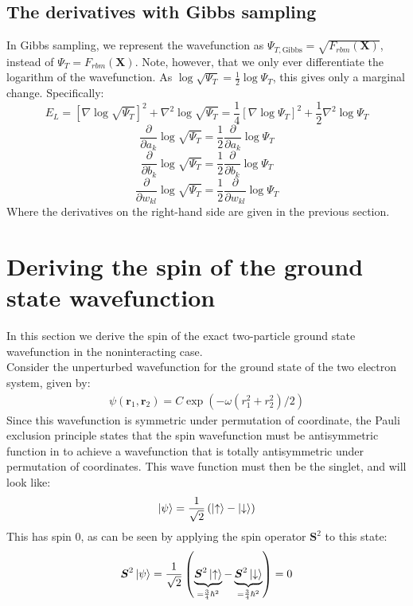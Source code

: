 \documentclass[a4paper, 10pt]{article}
\begin{document}
\begin{appendices}
	\subsection{The derivatives with Gibbs sampling}\label{ap:derivative_gibbs}
	In Gibbs sampling, we represent the wavefunction as $\Psi_{T, \mathrm{Gibbs}}=\sqrt{F_{rbm}(\boldsymbol{X})}$, instead of $\Psi_T=F_{rbm}(\boldsymbol{X})$. Note, however, that we only ever differentiate the logarithm of the wavefunction. As $\log \sqrt{\Psi_T}=\frac{1}{2}\log \Psi_T$, this gives only a marginal change. Specifically:
	\begin{equation}
	E_L=[\nabla \log \sqrt{\Psi_T}]^2 + \nabla^2 \log \sqrt{\Psi_T} =\frac{1}{4}[\nabla \log \Psi_T]^2 +\frac{1}{2}\nabla^2 \log \Psi_T
	\end{equation}
	\begin{equation}
	\frac{\partial }{\partial a_k}\log \sqrt{\Psi_T}=\frac{1}{2}\frac{\partial }{\partial a_k}\log \Psi_T
	\end{equation}
	\begin{equation}
	\frac{\partial }{\partial b_k}\log \sqrt{\Psi_T}=\frac{1}{2}\frac{\partial }{\partial b_k}\log \Psi_T
	\end{equation}
	\begin{equation}
	\frac{\partial}{\partial w_{kl}}\log \sqrt{\Psi_T}=\frac{1}{2}\frac{\partial}{\partial w_{kl}}\log \Psi_T
	\end{equation}
	Where the derivatives on the right-hand side are given in the previous section.
\section{Deriving the spin of the ground state wavefunction}\label{ap:Derivative_spin}
In this section we derive the spin of the exact two-particle ground state wavefunction in the noninteracting case.\\
\linebreak
Consider the unperturbed wavefunction for the ground state of the
two electron system, given by:
\begin{align}
\psi(\boldsymbol{r}_{1},\boldsymbol{r}_{2}) =
C\exp\left(-\omega\left(r_{1}^{2} + r_{2}^{2}\right)/2\right)
\end{align}
Since this wavefunction is symmetric under permutation of coordinate, the
Pauli exclusion principle states that the spin wavefunction must be antisymmetric function in to achieve a wavefunction that is totally antisymmetric under permutation of coordinates. This wave function must then be the singlet, and will look like:
\begin{align}
\ket{\psi} = \frac{1}{\sqrt{2}}\left(\ket{\uparrow} - \ket{\downarrow}\right)
\end{align}
This has spin $0$, as can be seen by applying the spin operator $\boldsymbol{S}^{2}$ to this state:
\begin{align}
\boldsymbol{S}^{2}\ket{\psi} = \frac{1}{\sqrt{2}}\left(
\underbrace{\boldsymbol{S}^{2}\ket{\uparrow}}_{= \frac{3}{4}\hbar^{2}} -
\underbrace{\boldsymbol{S}^{2}\ket{\downarrow}}_{= \frac{3}{4}\hbar^{2}}\right)
= 0
\end{align}
	\end{appendices}
\end{document}
